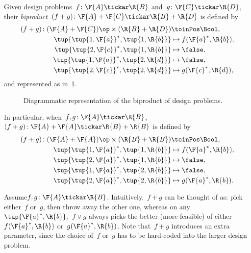 \begin{definition}
Given design problems~$f\colon \F{A} \tickar \R{B}$ and~$g\colon \F{C} \tickar \R{D}$, their \emph{biproduct}~$(f + g)\colon \F{A} + \F{C} \tickar \R{B} + \R{D}$ is defined by
\begin{equation}
\begin{aligned}
    (f + g)\colon (\F{A} + \F{C})\op  \times (\R{B} + \R{D}) & \toinPos \Bool,  \\
            \tup{ \tup{1,\F{a}}^*, \tup{1,\R{b}}} & \mapsto f(\F{a}^*, \R{b}), \\
            \tup{ \tup{2,\F{c}}^*, \tup{1,\R{b}}} & \mapsto \false, \\
            \tup{ \tup{1,\F{a}}^*, \tup{2,\R{d}}} & \mapsto \false, \\
            \tup{ \tup{2,\F{c}}^*, \tup{2,\R{d}}} & \mapsto g(\F{c}^*, \R{d}),
\end{aligned}
\end{equation}
and represented as in~\cref{fig:biproductdp}.

\begin{figure}[h!]
\begin{center}
\end{center}
\caption{Diagrammatic representation of the biproduct of design problems. \label{fig:biproductdp}}
\end{figure}
In particular, when~$f, g\colon \F{A} \tickar \R{B}$,~$(f + g)\colon \F{A} + \F{A} \tickar \R{B} + \R{B}$ is defined by
\begin{equation}
\begin{aligned}
    (f + g) \colon (\F{A} + \F{A})\op  \times (\R{B} + \R{B}) & \toinPos \Bool,  \\
            \tup{ \tup{1, \F{a}}^*, \tup{1, \R{b}}} & \mapsto f(\F{a}^*, \R{b}), \\
            \tup{ \tup{2, \F{a}}^*, \tup{1, \R{b}}} & \mapsto \false, \\
            \tup{ \tup{1, \F{a}}^*, \tup{2, \R{b}}} & \mapsto \false, \\
            \tup{ \tup{2, \F{a}}^*, \tup{2, \R{b}}} & \mapsto g(\F{a}^*, \R{b}).
\end{aligned}
\end{equation}
\end{definition}


Assume$f,g \colon \F{A} \tickar \R{B}$. Intuitively,~$f+g$ can be thought of as: pick either~$f$ or~$g$, then throw away the other one, whereas on any~$\tup{\F{a}^*,\R{b}}$,~$f \vee g$ always picks the better (more feasible) of either~$f(\F{a}^*,\R{b})$ or~$g(\F{a}^*,\R{b})$. Note that~$f+g$ introduces an extra parameter, since the choice of~$f$ or~$g$ has to be hard-coded into the larger design problem.


